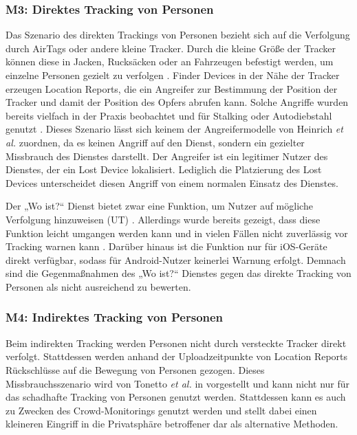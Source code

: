 
\subsubsection[M3]{M3: Direktes Tracking von Personen}
\label{missbrauch:3}
Das Szenario des direkten Trackings von Personen bezieht sich auf die Verfolgung durch AirTags oder andere kleine Tracker.
Durch die kleine Größe der Tracker können diese in Jacken, Rucksäcken oder an Fahrzeugen befestigt werden, um einzelne Personen gezielt zu verfolgen \cite{Roth_airtags}.
Finder Devices in der Nähe der Tracker erzeugen Location Reports, die ein Angreifer zur Bestimmung der Position der Tracker und damit der Position des Opfers abrufen kann.
Solche Angriffe wurden bereits vielfach in der Praxis beobachtet und für Stalking oder Autodiebstahl genutzt \cite{NYT_Airtags}.
Dieses Szenario lässt sich keinem der Angreifermodelle von Heinrich \textit{et al.} \cite{Heinrich_FindMy} zuordnen, da es keinen Angriff auf den Dienst, sondern ein gezielter Missbrauch des Dienstes darstellt.
Der Angreifer ist ein legitimer Nutzer des Dienstes, der ein Lost Device lokalisiert.
Lediglich die Platzierung des Lost Devices unterscheidet diesen Angriff von einem normalen Einsatz des Dienstes.

Der „Wo ist?“ Dienst bietet zwar eine Funktion, um Nutzer auf mögliche Verfolgung hinzuweisen (\ac{UT}) \cite{Apple_FindMySpec}.
Allerdings wurde bereits gezeigt, dass diese Funktion leicht umgangen werden kann \cite{Mayberry_Tracking} und in vielen Fällen nicht zuverlässig vor Tracking warnen kann \cite{Heinrich_AirGuard}.
Darüber hinaus ist die Funktion nur für iOS-Geräte direkt verfügbar, sodass für Android-Nutzer keinerlei Warnung erfolgt.
Demnach sind die Gegenmaßnahmen des „Wo ist?“ Dienstes gegen das direkte Tracking von Personen als nicht ausreichend zu bewerten.


\subsubsection[M4]{M4: Indirektes Tracking von Personen}
\label{missbrauch:4}
Beim indirekten Tracking werden Personen nicht durch versteckte Tracker direkt verfolgt.
Stattdessen werden anhand der Uploadzeitpunkte von Location Reports Rückschlüsse auf die Bewegung von Personen gezogen.
Dieses Missbrauchsszenario wird von Tonetto \textit{et al.} in \cite{Tonetto_FindMy} vorgestellt und kann nicht nur für das schadhafte Tracking von Personen genutzt werden.
Stattdessen kann es auch zu Zwecken des Crowd-Monitorings genutzt werden und stellt dabei einen kleineren Eingriff in die Privatsphäre betroffener dar als alternative Methoden. 

